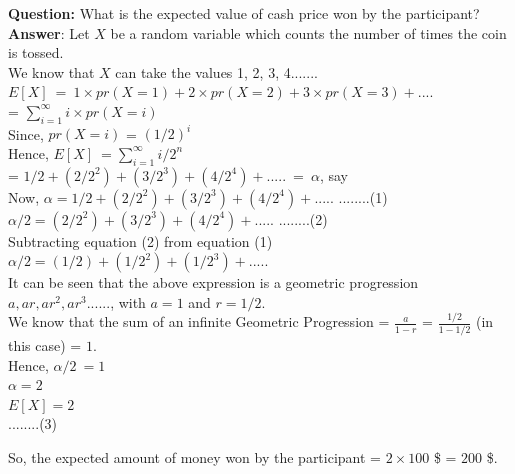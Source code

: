 \documentclass{llncs}
\begin{document}
\textbf{Question:} What is the expected value of cash price won by the participant?\\

\textbf{Answer}: 
Let $X$ be a random variable which counts the number of times the coin is tossed.\\

We know that $X$ can take the values 1, 2, 3, 4.......\\
$E[X]\ =\ 1 \times pr(X=1) + 2 \times pr(X=2) + 3 \times pr(X=3)+ .... $\\

= $\sum_{i=1}^{\infty} i \times pr(X=i) $\\

Since, $ pr(X=i) $ = $(1/2)^i$\\

Hence, $E[X]\ = \sum_{i=1}^{\infty} i/2^{n} $\\

= $1/2+(2/2^2)+(3/2^3)+(4/2^4)+.....\ =\ \alpha$, say\\

Now, $\alpha = 1/2+(2/2^2)+(3/2^3)+(4/2^4)+.....$ \hspace{5mm} ........(1)\\

$\alpha/2 = (2/2^2)+(3/2^3)+(4/2^4)+.....$\hspace{5mm} ........(2)\\

Subtracting equation (2) from equation (1) \\

$\alpha/2= (1/2)+(1/2^2)+(1/2^3)+.....$\\

It can be seen that the above expression is a geometric progression $a,ar,ar^2,ar^3......$, with $a=1$ and $r=1/2$.\\

We know that the sum of an infinite Geometric Progression = $\frac{a}{1-r}$ = $\frac{1/2}{1-1/2}$ (in this case) = $1$. \\

Hence, $\alpha/2\ = 1$\\

$\alpha=2$\\

$E[X]=2$\\  	\hspace{5mm} ........(3)

So, the expected amount of money won by the participant = $2 \times 100$ \$ = $200$ \$.\\
\end{document}
